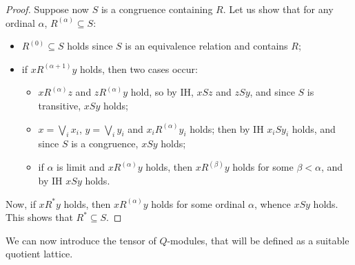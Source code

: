 \begin{proof}
%
%

Suppose now $S$ is a congruence containing $R$.
Let us show that for any ordinal $\alpha$, $R^{(\alpha)}\subseteq S$:
\begin{itemize}
\item $R^{(0)}\subseteq S$ holds since $S$ is an equivalence relation and contains $R$;

\item if $x R^{(\alpha+1)}y$ holds, then two cases occur:
	\begin{itemize}
	\item $xR^{(\alpha)}z$ and $zR^{(\alpha)}y$ hold, so by IH, 
	$xSz$ and $zSy$, and since $S$ is transitive, $xSy$ holds;
	\item $x=\bigvee_{i}x_{i}$, $y=\bigvee_{i}y_{i}$ and $x_{i}R^{(\alpha)}y_{i}$ holds; then by IH $x_{i}Sy_{i}$ holds, and since $S$ is a congruence, $xSy$ holds;
	
\item if $\alpha$ is limit and $xR^{(\alpha)}y$ holds, then $xR^{(\beta)}y$ holds for some $\beta<\alpha$, and by IH $xS y$ holds.
	
	\end{itemize}

\end{itemize}
Now, if $x R^{*} y$ holds, then $xR^{(\alpha)}y$ holds for some ordinal $\alpha$, whence $xS y$ holds.
This shows that $R^{*}\subseteq S$.
%
\end{proof}


We can now introduce the tensor of $Q$-modules, that will be defined as a suitable quotient lattice. 

